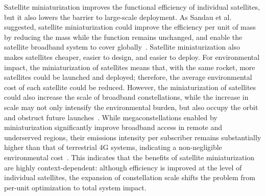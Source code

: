 \documentclass[12pt]{article}
\begin{document}
Satellite miniaturization improves the functional efficiency of individual satellites, but it also lowers the barrier to large-scale deployment. As Sandau et al. suggested, satellite miniaturization could improve the efficiency per unit of mass by reducing the mass while the function remains unchanged, and enable the satellite broadband system to cover globally~\citep{sandau2010smallsat}. Satellite miniaturization also makes satellites cheaper, easier to design, and easier to deploy. For environmental impact, the miniaturization of satellites means that, with the same rocket, more satellites could be launched and deployed; therefore, the average environmental cost of each satellite could be reduced. However, the miniaturization of satellites could also increase the scale of broadband constellations, while the increase in scale may not only intensify the environmental burden, but also occupy the orbit and obstruct future launches~\citep{kumaran2024manufacturing}. While megaconstellations enabled by miniaturization significantly improve broadband access in remote and underserved regions, their emissions intensity per subscriber remains substantially higher than that of terrestrial 4G systems, indicating a non-negligible environmental cost~\citep{osoro2025leo,kukreja2025leo}. This indicates that the benefits of satellite miniaturization are highly context-dependent: although efficiency is improved at the level of individual satellites, the expansion of constellation scale shifts the problem from per-unit optimization to total system impact.
\end{document}
